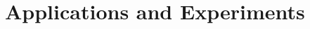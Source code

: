 \documentclass[lettersize,journal]{IEEEtran}
\begin{document}
\section{Applications and Experiments}


\end{document}
